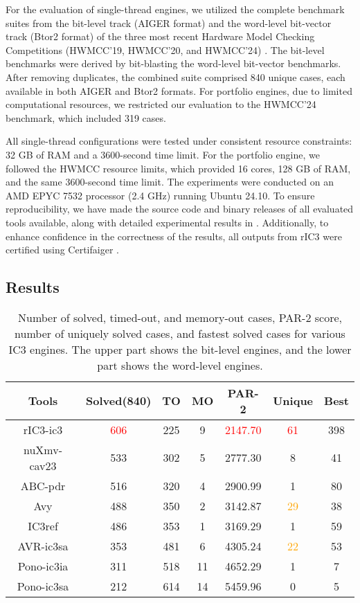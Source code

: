 \documentclass[runningheads]{llncs}
\begin{document}
For the evaluation of single-thread engines, we utilized the complete benchmark suites from the bit-level track (AIGER format) and the word-level bit-vector track (Btor2 format) of the three most recent Hardware Model Checking Competitions (HWMCC’19, HWMCC’20, and HWMCC’24) \cite{HWMCC}. The bit-level benchmarks were derived by bit-blasting the word-level bit-vector benchmarks. After removing duplicates, the combined suite comprised 840 unique cases, each available in both AIGER and Btor2 formats. For portfolio engines, due to limited computational resources, we restricted our evaluation to the HWMCC’24 benchmark, which included 319 cases.

All single-thread configurations were tested under consistent resource constraints: 32 GB of RAM and a 3600-second time limit. For the portfolio engine, we followed the HWMCC resource limits, which provided 16 cores, 128 GB of RAM, and the same 3600-second time limit. The experiments were conducted on an AMD EPYC 7532 processor (2.4 GHz) running Ubuntu 24.10. To ensure reproducibility, we have made the source code and binary releases of all evaluated tools available, along with detailed experimental results in \cite{Artifact}. Additionally, to enhance confidence in the correctness of the results, all outputs from rIC3 were certified using Certifaiger \cite{Certifaiger}.

\subsection{Results}

\begin{table}[!t]
\centering
\setlength{\tabcolsep}{9pt}
\caption{Number of solved, timed-out, and memory-out cases, PAR-2 score, number of uniquely solved cases, and fastest solved cases for various IC3 engines. The upper part shows the bit-level engines, and the lower part shows the word-level engines.}
\label{tab:IC3Result}
\begin{tabular}{c c c c c c c}
\hline
Tools & Solved(840) & TO & MO & PAR-2 & Unique & Best \\
\hline
rIC3-ic3 & \textcolor{red}{606} & 225 & 9 & \textcolor{red}{2147.70} & \textcolor{red}{61} & 398\\
nuXmv-cav23 & 533 & 302 & 5 & 2777.30 & 8 & 41 \\
ABC-pdr & 516 & 320 & 4 & 2900.99 & 1 & 80 \\
Avy & 488 & 350 & 2 & 3142.87 & \textcolor{orange}{29} & 38 \\
IC3ref & 486 & 353 & 1 & 3169.29 & 1 & 59 \\
\hline
AVR-ic3sa & 353 & 481 & 6 & 4305.24 & \textcolor{orange}{22} & 53\\
Pono-ic3ia &311 &518 &11 &4652.29 & 1 & 7 \\
Pono-ic3sa & 212 & 614 & 14 & 5459.96 & 0 & 5\\
\hline
\end{tabular}
\end{table}
\end{document}
